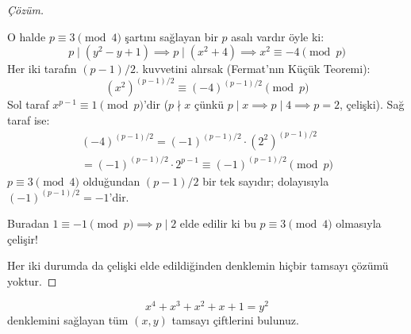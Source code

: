 \begin{proof}[Çözüm]
\begin{enumerate}
    O halde $p \equiv 3 \pmod 4$ şartını sağlayan bir $p$ asalı vardır öyle ki:
    \[
    p \mid (y^2 - y + 1) \implies p \mid (x^2 + 4) \implies x^2 \equiv -4 \pmod p
    \]
    Her iki tarafın $(p-1)/2$. kuvvetini alırsak (Fermat'nın Küçük Teoremi):
    \[
    (x^2)^{(p-1)/2} \equiv (-4)^{(p-1)/2} \pmod p
    \]
    Sol taraf $x^{p-1} \equiv 1 \pmod p$'dir ($p \nmid x$ çünkü $p \mid x \implies p \mid 4 \implies p = 2$, çelişki).
    Sağ taraf ise:
    \begin{multline*}
    (-4)^{(p-1)/2} = (-1)^{(p-1)/2} \cdot (2^2)^{(p-1)/2} \\
    = (-1)^{(p-1)/2} \cdot 2^{p-1} \equiv (-1)^{(p-1)/2} \pmod p
    \end{multline*}
    $p \equiv 3 \pmod 4$ olduğundan $(p-1)/2$ bir tek sayıdır;\; dolayısıyla $(-1)^{(p-1)/2} = -1$'dir.
    
    Buradan $1 \equiv -1 \pmod p \implies p \mid 2$ elde edilir ki bu $p \equiv 3 \pmod 4$ olmasıyla çelişir!
\end{enumerate}
Her iki durumda da çelişki elde edildiğinden denklemin hiçbir tamsayı çözümü yoktur.
\end{proof}

\begin{example}
\[
x^4 + x^3 + x^2 + x + 1 = y^2
\]
denklemini sağlayan tüm $(x, y)$ tamsayı çiftlerini bulunuz.
\end{example}

